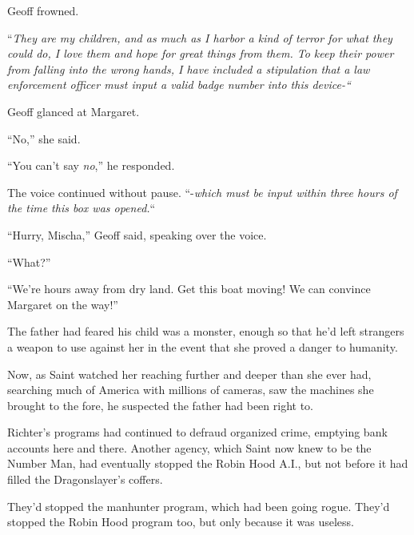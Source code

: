 Geoff frowned.



``\emph{They are my children, and as much as I harbor a kind of terror for what they could do, I love them and hope for great things from them.  To keep their power from falling into the wrong hands, I have included a stipulation that a law enforcement officer must input a valid badge number into this device-``}



Geoff glanced at Margaret.



``No,'' she said.



``You can't say \emph{no},'' he responded.



The voice continued without pause.  ``-\emph{which must be input within three hours of the time this box was opened.}``



``Hurry, Mischa,'' Geoff said, speaking over the voice.



``What?''



``We're hours away from dry land.  Get this boat moving!  We can convince Margaret on the way!''



\sectionbreak



The father had feared his child was a monster, enough so that he'd left strangers a weapon to use against her in the event that she proved a danger to humanity.



Now, as Saint watched her reaching further and deeper than she ever had, searching much of America with millions of cameras, saw the machines she brought to the fore, he suspected the father had been right to.



Richter's programs had continued to defraud organized crime, emptying bank accounts here and there.  Another agency, which Saint now knew to be the Number Man, had eventually stopped the Robin Hood A.I., but not before it had filled the Dragonslayer's coffers.



They'd stopped the manhunter program, which had been going rogue.  They'd stopped the Robin Hood program too, but only because it was useless.




